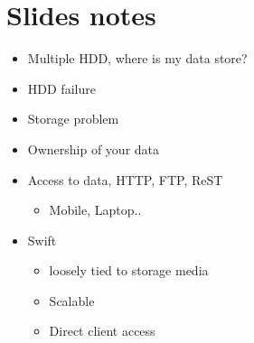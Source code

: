 \documentclass{article}
\begin{document}
\section{Slides notes}
\label{sec:orgb62c640}
\begin{itemize}
\item Multiple HDD, where is my data store?
\item HDD failure
\item Storage problem

\item Ownership of your data
\item Access to data, HTTP, FTP, ReST
\begin{itemize}
\item Mobile, Laptop..
\end{itemize}

\item Swift
\begin{itemize}
\item loosely tied to storage media
\item Scalable
\item Direct client access
\end{itemize}
\end{itemize}
\end{document}
